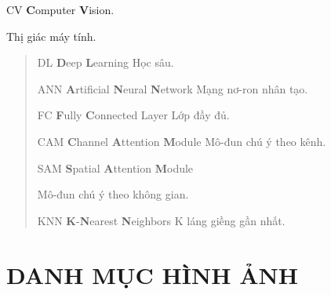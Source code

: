 \documentclass[
]{article}
\begin{document}
CV \textbf{C}omputer \textbf{V}ision.

Thị giác máy tính.

\begin{quote}
DL \textbf{D}eep \textbf{L}earning Học sâu.

ANN \textbf{A}rtificial \textbf{N}eural \textbf{N}etwork Mạng nơ-ron
nhân tạo.

FC \textbf{F}ully \textbf{C}onnected Layer Lớp đầy đủ.

CAM \textbf{C}hannel \textbf{A}ttention \textbf{M}odule Mô-đun chú ý
theo kênh.

SAM \textbf{S}patial \textbf{A}ttention \textbf{M}odule

Mô-đun chú ý theo không gian.

KNN \textbf{K}-\textbf{N}earest \textbf{N}eighbors K láng giềng gần
nhất.
\end{quote}

\section{DANH MỤC HÌNH ẢNH}\label{danh-mux1ee5c-huxecnh-ux1ea3nh}
\end{document}
